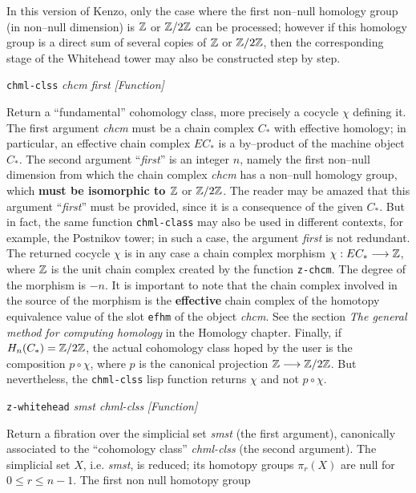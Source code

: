 In this version of Kenzo, only the case where the first non--null
homology group (in non--null dimension) is ${{\Bbb Z}}$ or ${{\Bbb Z}}/{2 {{\Bbb Z}}}$ can be processed; however if this 
homology group is a direct sum of several copies of ${{\Bbb Z}}$ or ${{\Bbb Z}}/{2 {{\Bbb Z}}}$, then the corresponding
stage of the Whitehead tower may also be constructed step by step.
\vskip 0.35cm
{\parindent=0mm
{\leftskip=5mm
{\tt chml-clss} {\em chcm first}  \hfill {\em [Function]} \par}
{\leftskip=15mm
Return a ``fundamental'' cohomology class, more precisely a cocycle $\chi$ defining it.
The first argument {\em chcm} must be a chain complex $C_*$ with effective homology; in particular, 
an effective chain complex $EC_*$ is a by--product of the machine object $C_*$. The second argument ``{\em first}''
is an integer $n$, namely the first non--null dimension from which the chain complex
{\em chcm} has a non--null homology group, which {\bf must be isomorphic to ${{\Bbb Z}}$} or ${{\Bbb Z}}/{2 {{\Bbb Z}}}$.
The reader may be amazed that this argument ``{\em first}'' must be provided, since it is  a consequence
of the given $C_*$. But in fact, the same function {\tt chml-class} may also be used in different contexts, for example,
the Postnikov tower; in such a case, the argument {\em first} is not redundant. The returned cocycle $\chi$
is in any case a chain complex morphism $\chi: EC_* \longrightarrow {{\Bbb Z}}$, where ${{\Bbb Z}}$ is the unit chain complex
created by the function {\tt z-chcm}. The degree of the morphism is $- n$.
It is important to note that  the chain complex involved in the source of the morphism
is the {\bf effective} chain complex of the homotopy equivalence value of the slot {\tt efhm} of
the object {\em chcm}. See the section {\em The general method for computing homology} in the Homology chapter.
Finally, if $H_n(C_*)={{\Bbb Z}}/{2 {{\Bbb Z}}}$, the actual cohomology class hoped by the user is the composition
$p \circ \chi$, where $p$ is the canonical projection ${{\Bbb Z}} \longrightarrow {{\Bbb Z}}/{2 {{\Bbb Z}}}$. But nevertheless,
the {\tt chml-clss} lisp function returns $\chi$ and not $p \circ \chi$.
\par}
{\leftskip=5mm
{\tt z-whitehead} {\em smst chml-clss}  \hfill {\em [Function]} \par}
{\leftskip=15mm
Return a fibration  over the simplicial set {\em smst} (the first argument), canonically associated
to the ``cohomology class'' {\em chml-clss} (the second argument). The simplicial set $X$, i.e. {\em smst}, is 
reduced; its homotopy groups $\pi_r(X)$ are null for $0 \leq r \leq n-1$. The first non null homotopy group
}}

